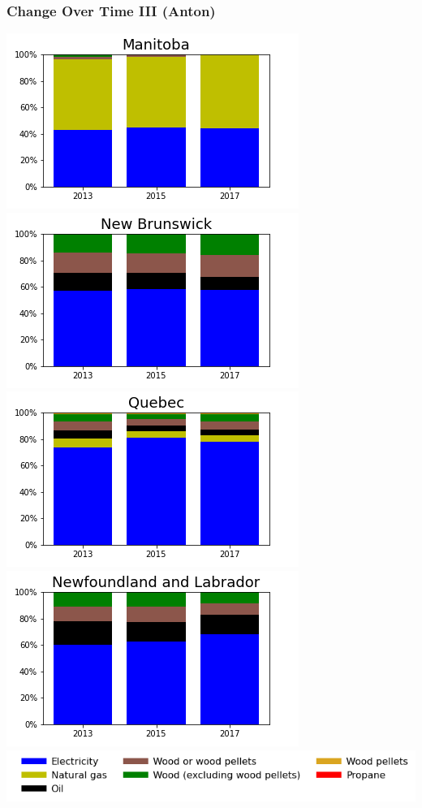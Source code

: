 \documentclass{beamer}
\begin{document}
\begin{frame}
\frametitle{Change Over Time III (Anton)}
\vspace{-10pt}
\begin{center}
\includegraphics[width=0.48\linewidth]{mn.png}%
\includegraphics[width=0.48\linewidth]{nb.png}\\
\includegraphics[width=0.48\linewidth]{qc.png}%
\includegraphics[width=0.48\linewidth]{nl.png}\\
\includegraphics[width=0.8\linewidth]{leg_bar.png}
\end{center}
\end{frame}
\end{document}
